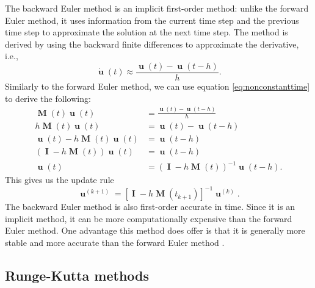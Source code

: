 \documentclass[12pt, oneside]{report}   	%
\DeclareMathOperator{\Id}{\boldsymbol{I}}
\DeclareMathOperator{\MM}{\boldsymbol{M}}
\DeclareMathOperator{\uu}{\boldsymbol{u}}
\begin{document}
The backward Euler method is an implicit first-order method: unlike the forward Euler method, it uses information from the current time step and the previous time step to approximate the solution at the next time step. The method is derived by using the backward finite differences to approximate the derivative, i.e.,
$$
\dot{\uu}(t)\approx\frac{\uu(t)-\uu(t-h)}{h}.
$$
Similarly to the forward Euler method, we can use equation \eqref{eq:nonconstanttime} to derive the following:
\begin{align*}
\MM(t)\uu(t) &= \frac{\uu(t)-\uu(t-h)}{h} \\
h \MM(t)\uu(t) &= \uu(t)-\uu(t-h) \\
\uu(t) - h \MM(t)\uu(t) &= \uu(t-h) \\
(\Id - h \MM(t))\uu(t) &= \uu(t-h) \\
\uu(t) &= (\Id - h \MM(t))^{-1}\uu(t-h).
\end{align*}
This gives us the update rule
\begin{equation}
\uu^{(k+1)} = [\Id - h\MM(t_{k+1})]^{-1}\uu^{(k)}.
\end{equation}
The backward Euler method is also first-order accurate in time. Since it is an implicit method, it can be more computationally expensive than the forward Euler method. One advantage this method does offer is that it is generally more stable and more accurate than the forward Euler method \cite{quarteroni2006scientific}.

\subsection{Runge-Kutta methods}
\end{document}
